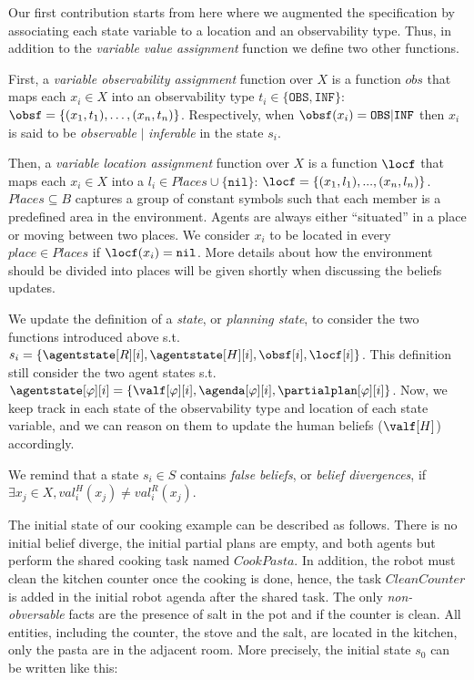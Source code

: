 Our first contribution starts from here where we augmented the specification by associating each state variable to a location and an observability type. Thus, in addition to the \textit{variable value assignment} function we define two other functions.

First, a \textit{variable observability assignment} function over $X$ is a function $obs$ that maps each $x_i \in X$ into an observability type $t_i \in \{ \texttt{OBS},  \texttt{INF} \}$: $\obsf = \{ (x_1,t_1), \ldots , (x_n,t_n) \}$. Respectively, when $\obsf(x_i) = \texttt{OBS} | \texttt{INF}$ then $x_i$ is said to be \textit{observable} $|$ \textit{inferable} in the state $s_i$.

Then, a \textit{variable location assignment} function over $X$ is a function $\locf$ that maps each $x_i \in X$ into a $l_i \in Places \cup \{ \texttt{nil} \}$: $\locf = \{ (x_1,l_1), ..., (x_n,l_n) \}$. 
$Places \subseteq B$ captures a group of constant symbols such that each member is a predefined area in the environment. 
Agents are always either ``situated'' in a place or moving between two places. 
We consider $x_i$ to be located in every $place \in Places$ if $\locf(x_i)=\texttt{nil}$. 
More details about how the environment should be divided into places will be given shortly when discussing the beliefs updates.

We update the definition of a \textit{state}, or \textit{planning state}, to consider the two functions introduced above s.t. $s_i = \{ \agentstate[R][i], \agentstate[H][i], \obsf[i], \locf[i] \}$. This definition still consider the two agent states s.t. $\agentstate[\varphi][i] = \{ \valf[\varphi][i], \agenda[\varphi][i], \partialplan[\varphi][i] \}$. Now, we keep track in each state of the observability type and location of each state variable, and we can reason on them to update the human beliefs ($\valf[H]$) accordingly. 

We remind that a state $s_i \in S$ contains \textit{false beliefs}, or \textit{belief divergences}, if $\exists x_j \in X, val^H_i(x_j) \neq val^R_i(x_j)$. 

The initial state of our cooking example can be described as follows. There is no initial belief diverge, the initial partial plans are empty, and both agents but perform the shared cooking task named $CookPasta$. In addition, the robot must clean the kitchen counter once the cooking is done, hence, the task $CleanCounter$ is added in the initial robot agenda after the shared task. The only \textit{non-obversable} facts are the presence of salt in the pot and if the counter is clean. All entities, including the counter, the stove and the salt, are located in the kitchen, only the pasta are in the adjacent room. More precisely, the initial state $s_0$ can be written like this: 


